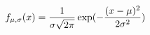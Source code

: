 \documentclass[preview]{standalone}
\begin{document}
\begin{align*}
\special{dvisvgm:raw <g id='unique000'>}f_{\mu,\sigma}(x)=\frac{1}{\sigma\sqrt{2\pi}}\exp(-\frac{(x-\mu)^2}{2\sigma^2})\special{dvisvgm:raw </g>}
\end{align*}
\end{document}
